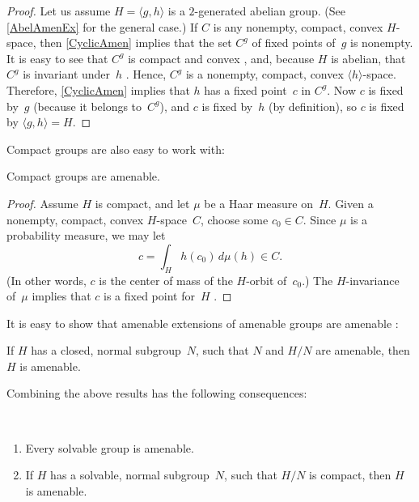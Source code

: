 \begin{proof}
Let us assume $H = \langle g,h \rangle$ is a $2$-generated abelian group. (See \cref{AbelAmenEx} for the general case.) If $C$ is any nonempty, compact, convex $H$-space, then \cref{CyclicAmen} implies that the set $C^g$ of fixed points of~$g$ is nonempty. It is easy to see that $C^g$ is compact and convex , and, because $H$ is abelian, that $C^g$ is invariant under~$h$ . Hence, $C^g$ is a nonempty, compact, convex $\langle h \rangle$-space. Therefore, \cref{CyclicAmen} implies that $h$ has a fixed point~$c$ in $C^g$. Now $c$ is fixed by~$g$ (because it belongs to~$C^g$), and $c$ is fixed by~$h$ (by definition), so $c$ is fixed by $\langle g,h \rangle = H$.
\end{proof}

Compact groups are also easy to work with:

\begin{prop} \label{CpctAmen}
Compact groups are amenable.
\end{prop}

\begin{proof}
Assume $H$ is compact, and let $\mu$ be a Haar measure on~$H$. 
Given a nonempty, compact, convex $H$-space~$C$, choose some $c_0 \in C$.
Since $\mu$ is a probability measure, we may let 
	\begin{equation} \label{CenterOfHOrbit}
	c = \int_H h(c_0) \, d\mu(h) \in C
	. \end{equation}
(In other words, $c$ is the center of mass of the $H$-orbit of~$c_0$.)
The $H$-invariance of~$\mu$ implies that $c$ is a fixed point for~$H$ .
\end{proof}

It is easy to show that amenable extensions of amenable groups are amenable :

\begin{prop} \label{AmenExtension}
 If $H$ has a closed, normal subgroup~$N$, such that $N$ and $H/N$ are amenable, then $H$ is amenable.
\end{prop}

Combining the above results has the following consequences:

\begin{cor} \label{AmenExtCor} \ 
\noprelistbreak
\begin{enumerate}
\item \label{AmenExtCor-Solvable} 
 Every solvable group is amenable.

\item \label{AmenExtCor-CocpctSolv}
If $H$ has a solvable, normal subgroup~$N$, such that $H/N$ is compact, then $H$ is amenable.

\end{enumerate}
\end{cor}

